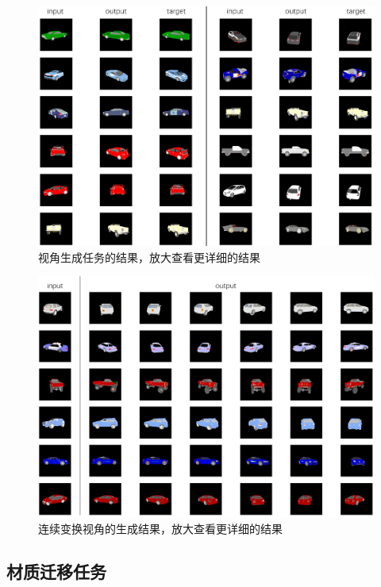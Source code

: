 \documentclass[UTF8,openany,AutoFakeBold,AutoFakeSlant,cs4size]{ctexbook}
\begin{document}
\begin{figure}
\centering
\includegraphics[width=\linewidth]{./images/novel_view_thesis.png}
\caption{视角生成任务的结果，放大查看更详细的结果}
\label{result_viewsynthesis}
\end{figure}

\begin{figure}
\centering
\includegraphics[width=\linewidth]{./images/novel_view_thesis_rotate.png}
\caption{连续变换视角的生成结果，放大查看更详细的结果}
\label{result_contview}
\end{figure}

\subsection{材质迁移任务}
\end{document}
